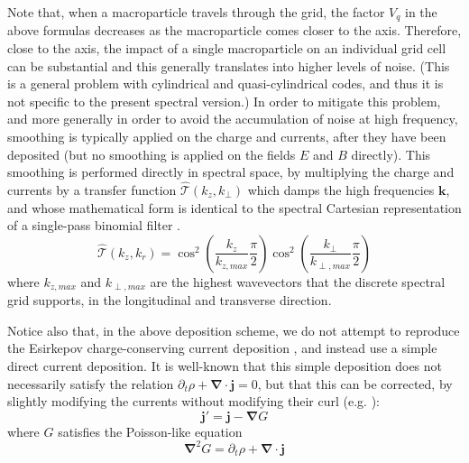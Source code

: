 \documentclass[1p,times]{elsarticle}
\renewcommand{\vec}[1]{\boldsymbol{#1}}
\newcommand{\spectral}[1]{\hat{\mathcal{#1}}}
\begin{document}
Note that, when a macroparticle travels through the grid, the factor
$V_q$ in the above formulas decreases as the macroparticle comes
closer to the axis. Therefore, close to the axis, the impact of a single macroparticle on
an individual grid cell can be substantial and this generally
translates into higher levels of noise. (This is a general
problem with cylindrical and quasi-cylindrical codes, and thus it is not specific to
the present spectral version.) In order to mitigate this problem, and
more generally in order to avoid the accumulation
of noise at high frequency, smoothing is 
typically applied on the charge and currents, after they
have been deposited (but no smoothing is applied on the
fields $E$ and $B$ directly). This smoothing
is performed directly in spectral space, by multiplying the charge
and currents by a transfer function $\spectral{T}(k_z, k_\perp)$ which
damps the high frequencies $\vec{k}$, and whose mathematical form is
identical to the spectral Cartesian representation of a single-pass
binomial filter \cite{Birdsall2004}.
\begin{equation} \spectral{T}(k_z, k_r) = \cos^2 \left( \frac{k_z}{k_{z,max}}\frac{\pi}{2} \right)
\cos^2\left( \frac{k_\perp}{k_{\perp,max}}\frac{\pi}{2} \right) \end{equation}
\noindent where $k_{z, max}$ and $k_{\perp,max}$ are the highest
wavevectors that the discrete spectral grid supports, in the
longitudinal and transverse direction.

Notice also that, in the above deposition scheme, we do not attempt to
reproduce the Esirkepov charge-conserving current deposition
\cite{Esirkepov}, and instead use a
simple direct current deposition. It is well-known that this simple deposition does not necessarily
satisfy the relation $\partial_t\rho + \vec{\nabla}\cdot\vec{j} =
0$, but that this can be corrected, by slightly modifying the
currents without modifying their curl (e.g. \cite{VayJCP2013}):
\begin{equation} \vec{j}' = \vec{j} - \vec{\nabla} G \end{equation}
where $G$ satisfies the Poisson-like equation
\begin{equation} \vec{\nabla}^2 G = \partial_t\rho + \vec{\nabla}\cdot\vec{j} \end{equation}
\end{document}
